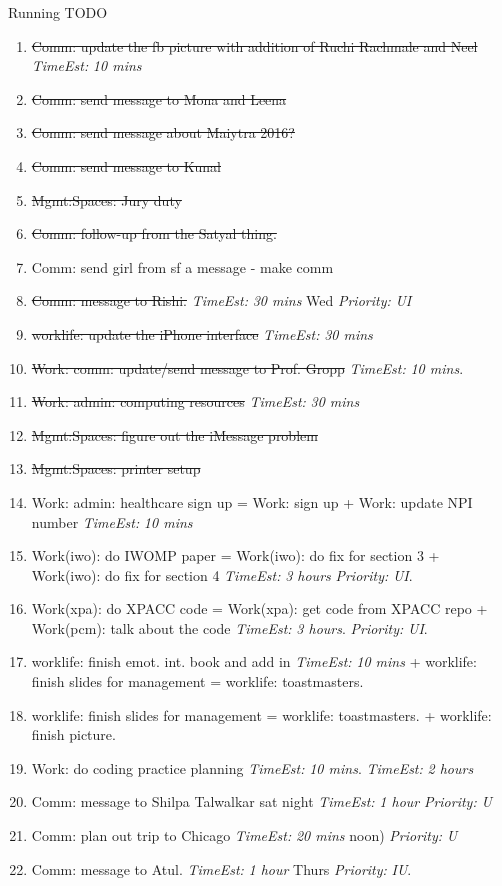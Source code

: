 \documentclass[serif, mathserif, final]{beamer}
\newcommand{\doneTask}[1]{\tiny \item \tiny \sout{#1}}
\newcommand{\te}[1]{\textit{TimeEst:} \textit{#1}}
\newcommand{\prio}[1]{\textit{Priority:} \textit{#1}}
\newcommand{\dl}[1]{#1}
\begin{document}
\begin{frame}{}
\begin{columns}
\begin{column}{0.50\linewidth}
\begin{block}{Running TODO}
        \begin{enumerate} 
          \doneTask{Comm: update the fb picture with addition of Ruchi Rachmale and Neel} \te{10 mins} 
      \doneTask{Comm: send message to Mona and Leena} 
      \doneTask{Comm: send message about Maiytra 2016?} 
      \doneTask{Comm: send message to Kunal}
      \doneTask{Mgmt:Spaces: Jury duty} 
      \doneTask{Comm: follow-up from the Satyal thing.} 
    \item \small Comm: send girl from sf a message - make comm    
    \doneTask{Comm: message to Rishi.} \te{30 mins} \dl{Wed}
      \prio{UI} 
    \doneTask{worklife: update the iPhone interface} \te{30 mins}
  \doneTask{Work: comm: update/send message to Prof. Gropp} \te{10
      mins}. 
\doneTask{Work: admin: computing resources} \te{30 mins}

\doneTask{ Mgmt:Spaces: figure out the iMessage problem }
\doneTask{Mgmt:Spaces: printer setup} 

\item \small Work: admin: healthcare sign up = Work: sign up  + Work:
  update NPI number  \te{10 mins} 
  
\item \small Work(iwo): do IWOMP paper = Work(iwo): do fix for section
  3 + Work(iwo): do fix for section 4 \te{3 hours} \prio{UI}. 
  
\item \small Work(xpa): do XPACC code = Work(xpa): get code from XPACC repo +
  Work(pcm): talk about the code \te{3 hours}. \prio{UI}. 
  
\item \small worklife: finish emot. int. book and add in
  \te{10 mins} +  worklife: finish slides for management =
  worklife: toastmasters. 
  
\item \small worklife: finish slides for management =
  worklife: toastmasters.  + worklife: finish picture. 
\item \small Work: do coding practice planning \te{10 mins}. \te{2
  hours} 
  
\item \small Comm: message to Shilpa Talwalkar \dl{sat night}
  \te{1 hour} \prio{U} 
  
\item \small Comm: plan out trip to Chicago \te{20 mins} \dl{noon)
  \prio{U} 
  
\item \small Comm: message to Atul. \te{1 hour}  \dl{Thurs}
  \prio{IU}. 
  
}
\end{enumerate}
\end{block}
\end{column}
\end{columns}
\end{frame}
\end{document}
